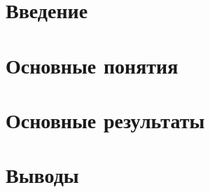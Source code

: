 





\tableofcontents
\pagebreak



\section{Введение}
	
\pagebreak

\section {Основные понятия}
	
\pagebreak
	
\section{Основные результаты}
	
	
\pagebreak
	
\section{Выводы}
	
\pagebreak
	


